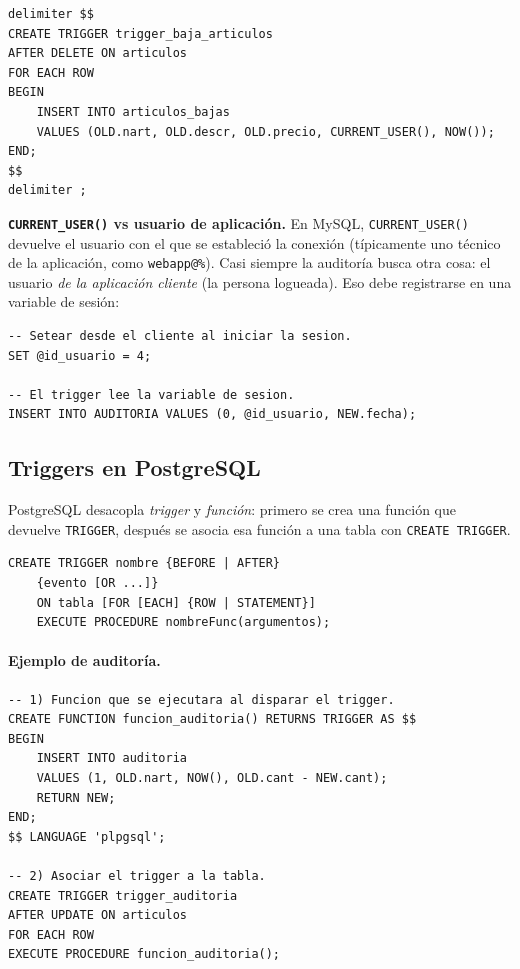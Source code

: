 \documentclass[11pt,a4paper]{article}
\begin{document}
\begin{lstlisting}
delimiter $$
CREATE TRIGGER trigger_baja_articulos
AFTER DELETE ON articulos
FOR EACH ROW
BEGIN
    INSERT INTO articulos_bajas
    VALUES (OLD.nart, OLD.descr, OLD.precio, CURRENT_USER(), NOW());
END;
$$
delimiter ;
\end{lstlisting}

\begin{nota}
\textbf{\texttt{CURRENT\_USER()} vs usuario de aplicación.} En MySQL,
\texttt{CURRENT\_USER()} devuelve el usuario con el que se estableció
la conexión (típicamente uno técnico de la aplicación, como
\texttt{webapp@\%}). Casi siempre la auditoría busca otra cosa: el
usuario \emph{de la aplicación cliente} (la persona logueada). Eso
debe registrarse en una variable de sesión:
\end{nota}

\begin{lstlisting}
-- Setear desde el cliente al iniciar la sesion.
SET @id_usuario = 4;

-- El trigger lee la variable de sesion.
INSERT INTO AUDITORIA VALUES (0, @id_usuario, NEW.fecha);
\end{lstlisting}

\subsection{Triggers en PostgreSQL}

PostgreSQL desacopla \emph{trigger} y \emph{función}: primero se crea
una función que devuelve \texttt{TRIGGER}, después se asocia esa
función a una tabla con \texttt{CREATE TRIGGER}.

\begin{lstlisting}
CREATE TRIGGER nombre {BEFORE | AFTER}
    {evento [OR ...]}
    ON tabla [FOR [EACH] {ROW | STATEMENT}]
    EXECUTE PROCEDURE nombreFunc(argumentos);
\end{lstlisting}

\paragraph{Ejemplo de auditoría.}

\begin{lstlisting}
-- 1) Funcion que se ejecutara al disparar el trigger.
CREATE FUNCTION funcion_auditoria() RETURNS TRIGGER AS $$
BEGIN
    INSERT INTO auditoria
    VALUES (1, OLD.nart, NOW(), OLD.cant - NEW.cant);
    RETURN NEW;
END;
$$ LANGUAGE 'plpgsql';

-- 2) Asociar el trigger a la tabla.
CREATE TRIGGER trigger_auditoria
AFTER UPDATE ON articulos
FOR EACH ROW
EXECUTE PROCEDURE funcion_auditoria();
\end{lstlisting}
\end{document}
